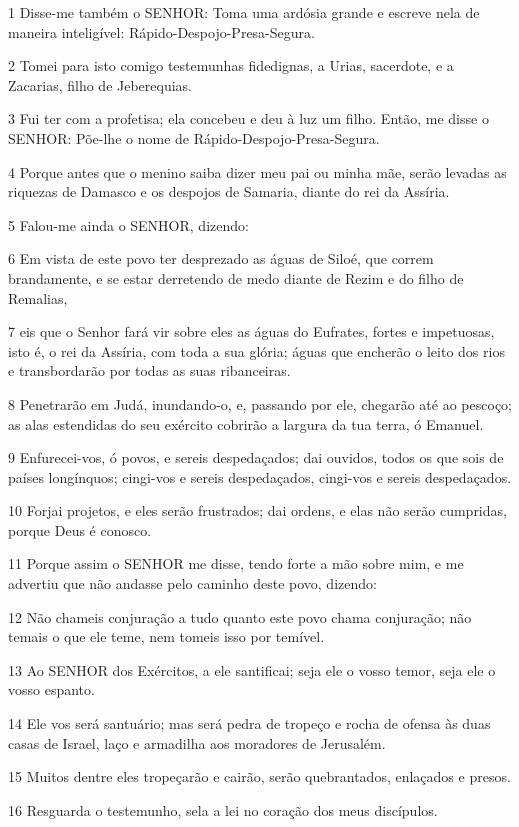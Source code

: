 \par 1 Disse-me também o SENHOR: Toma uma ardósia grande e escreve nela de maneira inteligível: Rápido-Despojo-Presa-Segura.
\par 2 Tomei para isto comigo testemunhas fidedignas, a Urias, sacerdote, e a Zacarias, filho de Jeberequias.
\par 3 Fui ter com a profetisa; ela concebeu e deu à luz um filho. Então, me disse o SENHOR: Põe-lhe o nome de Rápido-Despojo-Presa-Segura.
\par 4 Porque antes que o menino saiba dizer meu pai ou minha mãe, serão levadas as riquezas de Damasco e os despojos de Samaria, diante do rei da Assíria.
\par 5 Falou-me ainda o SENHOR, dizendo:
\par 6 Em vista de este povo ter desprezado as águas de Siloé, que correm brandamente, e se estar derretendo de medo diante de Rezim e do filho de Remalias,
\par 7 eis que o Senhor fará vir sobre eles as águas do Eufrates, fortes e impetuosas, isto é, o rei da Assíria, com toda a sua glória; águas que encherão o leito dos rios e transbordarão por todas as suas ribanceiras.
\par 8 Penetrarão em Judá, inundando-o, e, passando por ele, chegarão até ao pescoço; as alas estendidas do seu exército cobrirão a largura da tua terra, ó Emanuel.
\par 9 Enfurecei-vos, ó povos, e sereis despedaçados; dai ouvidos, todos os que sois de países longínquos; cingi-vos e sereis despedaçados, cingi-vos e sereis despedaçados.
\par 10 Forjai projetos, e eles serão frustrados; dai ordens, e elas não serão cumpridas, porque Deus é conosco.
\par 11 Porque assim o SENHOR me disse, tendo forte a mão sobre mim, e me advertiu que não andasse pelo caminho deste povo, dizendo:
\par 12 Não chameis conjuração a tudo quanto este povo chama conjuração; não temais o que ele teme, nem tomeis isso por temível.
\par 13 Ao SENHOR dos Exércitos, a ele santificai; seja ele o vosso temor, seja ele o vosso espanto.
\par 14 Ele vos será santuário; mas será pedra de tropeço e rocha de ofensa às duas casas de Israel, laço e armadilha aos moradores de Jerusalém.
\par 15 Muitos dentre eles tropeçarão e cairão, serão quebrantados, enlaçados e presos.
\par 16 Resguarda o testemunho, sela a lei no coração dos meus discípulos.
